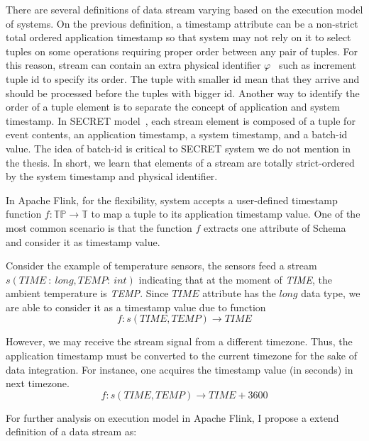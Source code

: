 There are several definitions of data stream varying based on the execution model of systems. On the previous definition, a timestamp attribute can be a non-strict total ordered application timestamp so that system may not rely on it to select tuples on some operations requiring proper order between any pair of tuples. For this reason, stream can contain an extra physical identifier  $\varphi$~\citep{Petit:2010} such as increment tuple id to specify its order. The tuple with smaller id mean that they arrive and should be processed before the tuples with bigger id. Another way to identify the order of a tuple element is to separate the concept of application and system timestamp. In SECRET model~\citep{Dindar:2013}, each stream element is composed of a tuple for event contents, an application timestamp, a system timestamp, and a batch-id value. The idea of batch-id is critical to SECRET system we do not mention in the thesis.
In short, we learn that elements of a stream are totally strict-ordered by the system timestamp and physical identifier.

In Apache Flink, for the flexibility, system accepts a user-defined timestamp function   $f: \mathbb{TP} \rightarrow \mathbb{T}$ to map a tuple to its application timestamp value. One of the most common scenario is that the function $f$ extracts one attribute of Schema and consider it as timestamp value.

Consider the example of temperature sensors, the sensors feed a stream $s(TIME\ :\ long,TEMP:\ int)$ indicating that at the moment of \textit{TIME}, the ambient temperature is \textit{TEMP}. Since $TIME$ attribute has the $long$ data type, we are able to consider it as a timestamp value due to function
\begin{equation}
f: s(TIME, TEMP) \rightarrow TIME
\end{equation}

However, we may receive the stream signal from a different timezone. Thus, the application timestamp must be converted to the current timezone for the sake of data integration. For instance, one acquires the timestamp value (in seconds) in next timezone.
\begin{equation}
f: s(TIME, TEMP) \rightarrow TIME + 3600
\end{equation}


For further analysis on execution model in Apache Flink, I propose a extend definition of a data stream as:


